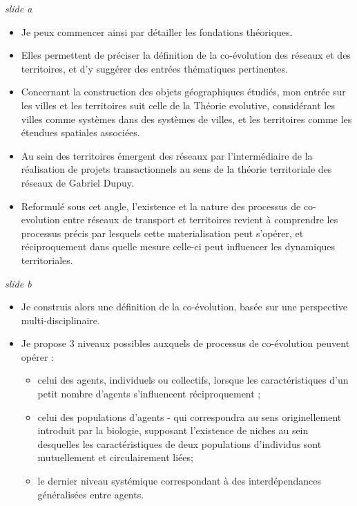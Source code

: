 \documentclass[12pt]{article}
\begin{document}
\textit{slide a}

\begin{itemize}
	\item Je peux commencer ainsi par détailler les fondations théoriques.
	\item Elles permettent de préciser la définition de la co-évolution des réseaux et des territoires, et d'y suggérer des entrées thématiques pertinentes.
	\item Concernant la construction des objets géographiques étudiés, mon entrée sur les villes et les territoires suit celle de la Théorie evolutive, considérant les villes comme systèmes dans des systèmes de villes, et les territoires comme les étendues spatiales associées.
	\item Au sein des territoires émergent des réseaux par l'intermédiaire de la réalisation de projets transactionnels au sens de la théorie territoriale des réseaux de Gabriel Dupuy.
	\item Reformulé sous cet angle, l'existence et la nature des processus de co-evolution entre réseaux de transport et territoires revient à comprendre les processus précis par lesquels cette materialisation peut s'opérer, et réciproquement dans quelle mesure celle-ci peut influencer les dynamiques territoriales.
\end{itemize}

\newpage

\textit{slide b}

\begin{itemize}
	\item Je construis alors une définition de la co-évolution, basée sur une perspective multi-disciplinaire.
	\item Je propose 3 niveaux possibles auxquels de processus de co-évolution peuvent opérer :
	\begin{itemize}
	    \item celui des agents, individuels ou collectifs, lorsque les caractéristiques d'un petit nombre d'agents s'influencent réciproquement ;
	    \item celui des populations d'agents - qui correspondra au sens originellement introduit par la biologie, supposant l'existence de niches au sein desquelles les caractéristiques de deux populations d'individus sont mutuellement et circulairement liées;
	    \item le dernier niveau systémique correspondant à des interdépendances généralisées entre agents.
	\end{itemize}
\end{itemize}
\end{document}
